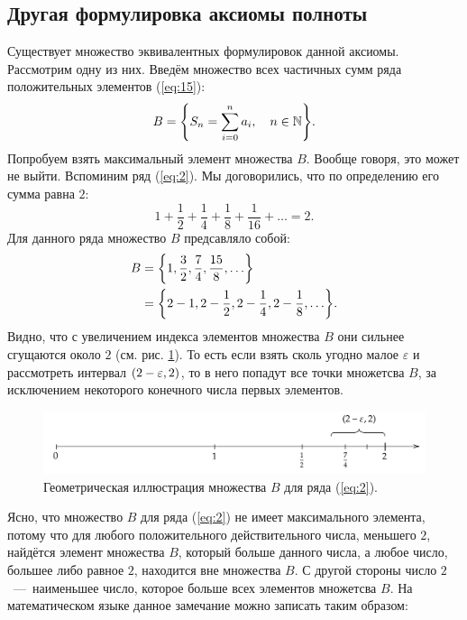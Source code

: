 \documentclass[12pt]{article}
\begin{document}
\subsection{Другая формулировка аксиомы полноты}
Существует множество эквивалентных формулировок данной аксиомы. Рассмотрим одну из них. Введём множество всех частичных сумм ряда положительных элементов (\ref{eq:15}):
\begin{equation}
    B = \qty{S_n = \sum_{i=0}^n a_i,\quad n\in \mathbb {N}}.
\end{equation}
Попробуем взять максимальный элемент множества $B$. Вообще говоря, это может не выйти. Вспоминим ряд (\ref{eq:2}). Мы договорились, что по определению его сумма равна $2$:
\begin{equation}
    1 + \dfrac{1}{2} + \dfrac14 + \dfrac18 + \dfrac{1}{16} + \ldots = 2.
\end{equation}
Для данного ряда множество $B$ предсавляло собой:
\begin{equation}
    \begin{split}
        B &= \qty{1,\dfrac{3}{2},\dfrac74,\dfrac{15}{8},\ldots}\\
        &=\qty{2-1,2-\dfrac{1}{2},2-\dfrac{1}{4},2-\dfrac{1}{8},\ldots}.
    \end{split}
\end{equation}
Видно, что с увеличением индекса элементов множества $B$ они сильнее сгущаются около $2$ (см. рис. \ref{fig:4}). То есть если взять сколь угодно малое $\varepsilon$ и рассмотреть интервал $\qty(2-\varepsilon,2)$, то в него попадут все точки множетсва $B$, за исключением некоторого конечного числа первых элементов.
\begin{figure}[ht]
    \centering
    \includegraphics[width = 1\textwidth]{fig4.png}
    \caption{Геометрическая иллюстрация множества $B$ для ряда (\ref{eq:2}).}
    \label{fig:4}
\end{figure}
Ясно, что множество $B$ для ряда (\ref{eq:2}) не имеет максимального элемента, потому что для любого положительного действительного числа, меньшего $2$, найдётся элемент множества $B$, который больше данного числа, а любое число, большее либо равное $2$, находится вне множества $B$. С другой стороны число $2$~\----~наименьшее число, которое больше всех элементов множетсва $B$. На математическом языке данное замечание можно записать таким образом:
\end{document}
